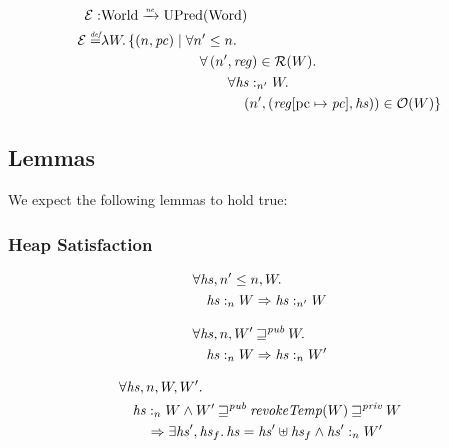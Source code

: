 \documentclass[a4paper]{article}
\newcommand{\update}[2]{[#1 \mapsto #2]}
\newcommand{\nefun}{\xrightarrow{\textit{\tiny{ne}}}}
\newcommand{\defeq}{\stackrel{\textit{\tiny{def}}}{=}}
\newcommand{\var}[1]{\mathit{#1}}
\newcommand{\hs}{\var{hs}}
\newcommand{\pc}{\mathit{pc}}
\newcommand{\pcreg}{\mathrm{pc}}
\newcommand{\reg}{\var{reg}}
\newcommand{\heap}{\var{heap}}
\newcommand{\futurewk}{\mathbin{\sqsupseteq}^{\var{pub}}}
\newcommand{\futurestr}{\mathbin{\sqsupseteq}^{\var{priv}}}
\newcommand{\heapSat}[3][\heap]{#1 :_{#2} #3}
\newcommand{\asmType}{\plaindom{AsmType}}
\newcommand{\plaindom}[1]{\mathrm{#1}}
\newcommand{\Words}{\plaindom{Word}}
\newcommand{\Worlds}{\plaindom{World}}
\newcommand{\UPred}[1]{\plaindom{UPred}(#1)}
\newcommand{\intr}[2]{\mathcal{#1}}
\newcommand{\exprintr}[1]{\intr{E}{#1}}
\newcommand{\regintr}[1]{\intr{R}{#1}}
\newcommand{\stder}{\exprintr{\asmType}}
\newcommand{\stdrr}{\regintr{\asmType}}
\newcommand{\observations}{\mathcal{O}}
\newcommand{\npair}[2][n]{\left(#1,#2 \right)}
\begin{document}
\begin{align*}
  \stder : & \Worlds \nefun \UPred{\Words} \\
  \stder \defeq & \lambda W \ldotp \{ \npair{\pc} \mid 
  \begin{aligned}[t]
    & \forall n' \leq n \ldotp\\
    & \quad \forall \npair[n']{\reg} \in \stdrr(W) \ldotp \\
    & \quad \qquad  \forall \heapSat[\hs]{n'}{W} \ldotp \\
    & \quad \qquad \quad \npair[n']{(\reg\update{\pcreg}{\pc},\hs)} \in \observations(W) \}
  \end{aligned}
\end{align*}

\subsection{Lemmas}
We expect the following lemmas to hold true:
\subsubsection{Heap Satisfaction}
\begin{lemma}
  \begin{align*}
    &\forall \hs, n' \leq n, W \ldotp \\
    &\quad \heapSat[\hs]{n}{W} \Rightarrow \heapSat[\hs]{n'}{W}
  \end{align*}
\end{lemma}

\begin{lemma}
  \begin{align*}
    & \forall \hs, n, W' \futurewk W \ldotp \\
    & \quad \heapSat[\hs]{n}{W} \Rightarrow \heapSat[\hs]{n}{W'}
  \end{align*}
\end{lemma}

\begin{lemma}
  \begin{align*}
    & \forall \hs, n, W, W' \ldotp \\
    & \quad  \heapSat[\hs]{n}{W} \land W' \futurewk \wrev{W} \futurestr W \\
    & \qquad \Rightarrow \exists \hs', \hs_f \ldotp \hs = \hs' \uplus \hs_f \land \heapSat[\hs']{n}{W'}
  \end{align*}
\end{lemma}
\end{document}

